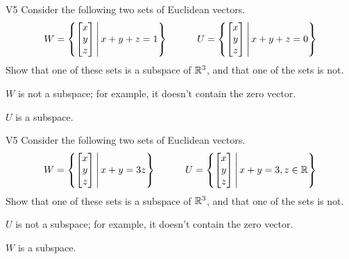 \begin{problem}{V5}
Consider the following two sets of Euclidean vectors.
\[
  W = \left\{\begin{bmatrix} x \\ y \\ z \end{bmatrix}\,\middle|\,x+y+z=1\right\}
\hspace{3em}
  U = \left\{\begin{bmatrix} x \\ y \\ z \end{bmatrix}\,\middle|\,x+y+z=0\right\}
\]
Show that one of these sets is a subspace of \(\mathbb{R}^3\), and
that one of the sets is not.
\end{problem}
\begin{solution}
\(W\) is not a subspace; for example, it doesn't contain the zero vector.

\(U\) is a subspace.
\end{solution}


\begin{problem}{V5}
Consider the following two sets of Euclidean vectors.
\[
  W = \left\{\begin{bmatrix} x \\ y \\ z \end{bmatrix}\,\middle|\,x+y=3z\right\}
\hspace{3em}
  U = \left\{\begin{bmatrix} x \\ y \\ z \end{bmatrix}\,\middle|\,x+y=3,z\in\mathbb{R}\right\}
\]
Show that one of these sets is a subspace of \(\mathbb{R}^3\), and
that one of the sets is not.
\end{problem}
\begin{solution}
\(U\) is not a subspace; for example, it doesn't contain the zero vector.

\(W\) is a subspace.
\end{solution}


